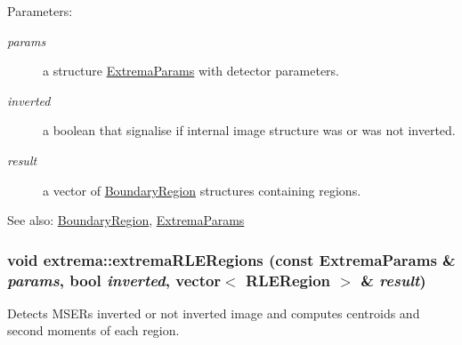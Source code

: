 \begin{Desc}
\item[Parameters:]
\begin{description}
\item[{\em params}]a structure \hyperlink{structextrema_1_1ExtremaParams}{Extrema\-Params} with detector parameters. \item[{\em inverted}]a boolean that signalise if internal image structure was or was not inverted. \item[{\em result}]a vector of \hyperlink{structextrema_1_1BoundaryRegion}{Boundary\-Region} structures containing regions.\end{description}
\end{Desc}
\begin{Desc}
\item[See also:]\hyperlink{structextrema_1_1BoundaryRegion}{Boundary\-Region}, \hyperlink{structextrema_1_1ExtremaParams}{Extrema\-Params} \end{Desc}
\hypertarget{namespaceextrema_f2c9422458c9780b00bb0ec050f97124}{
\subsubsection[extremaRLERegions]{\setlength{\rightskip}{0pt plus 5cm}void extrema::extrema\-RLERegions (const Extrema\-Params \& {\em params}, bool {\em inverted}, vector$<$ RLERegion $>$ \& {\em result})}}
\label{namespaceextrema_f2c9422458c9780b00bb0ec050f97124}


Detects MSERs inverted or not inverted image and computes centroids and second moments of each region. 

